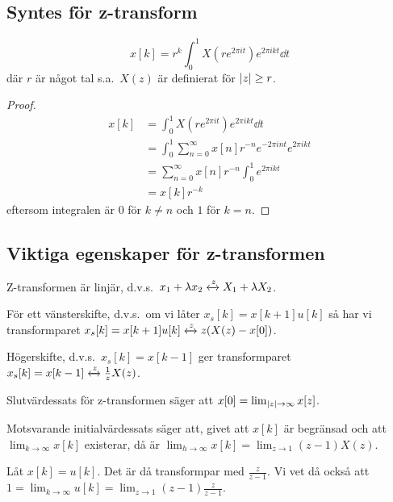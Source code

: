 \documentclass[a4paper]{article}
\begin{document}
\subsection{Syntes för z-transform}
\begin{sats}
    \[
        x[k] = r^k \int_0^1 X(re^{2\pi i t}) e^{2\pi i k t} \dd t
    \] där \(
        r
    \) är något tal s.a.\ \(
        X(z) 
    \) är definierat för \(
        \abs{z} \geq r
    \).

    \begin{proof}
        \begin{align*}
            x[k] &= \int_0^1 X(re^{2\pi i t}) e^{2\pi i k t} \dd t \\
                 &= \int_0^1 \sum_{n=0}^\infty x[n] r^{-n} e^{-2\pi int} 
                    e^{2\pi ikt} \\
                 &= \sum_{n=0}^\infty x[n] r^{-n} \int_0^1 e^{2\pi ikt} \\
                 &= x[k]r^{-k}
        \end{align*}
        eftersom integralen är \(
            0 
        \) för \(
            k \neq n
        \) och \(
            1
        \) för \(
            k = n
        \).
    \end{proof}
\end{sats}

\subsection{Viktiga egenskaper för z-transformen}
Z-transformen är linjär, d.v.s.\ \(
    x_1 + \lambda x_2 \xleftrightarrow{z} X_1 + \lambda X_2
\).

För ett vänsterskifte, d.v.s.\ om vi låter \(
    x_s[k] = x[k+1] u[k]
\) så har vi transformparet \(
    x_s[k] = x[k+1] u[k] \xleftrightarrow{z} z(X(z) - x[0])
\).

Högerskifte, d.v.s.\ \(
    x_s[k] = x[k-1] 
\) ger transformparet \(
    x_s[k] = x[k-1] \xleftrightarrow{z} \frac{1}{z} X(z)
\).

Slutvärdessats för z-transformen säger att \(
    x[0] = \lim_{\abs{z}\to \infty} x[z]
\).

Motsvarande initialvärdessats säger att, givet att \(
    x[k] 
\) är begränsad och att \(
    \lim_{k \to \infty} x[k] 
\) existerar, då är \(
    \lim_{h\to\infty} x[k] = \lim_{z \to 1}(z-1)X(z)
\).

\begin{ex}
    Låt \(
        x[k] = u[k]
    \). Det är då transformpar med \(
        \frac{z}{z-1} 
    \). Vi vet då också att \(
        1 = \lim_{k\to\infty} u[k] = \lim_{z\to 1} (z-1) \frac{z}{z-1} 
    \).
\end{ex}
\end{document}
